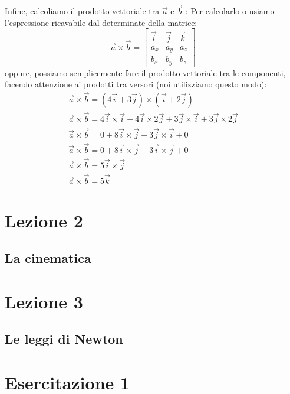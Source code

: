 \documentclass[a4paper]{book}
\begin{document}
Infine, calcoliamo il prodotto vettoriale tra $ \overrightarrow{a} $ e $ \overrightarrow{b} $ :
Per calcolarlo o usiamo l'espressione ricavabile dal determinate della matrice:
$$ \overrightarrow{a} \times \overrightarrow{b} = \begin{bmatrix}
\overrightarrow{i} & \overrightarrow{j} & \overrightarrow{k} \\
a_{x} & a_{y} & a_{z} \\
b_{x} & b_{y} & b_{z}
\end{bmatrix} $$
oppure, possiamo semplicemente fare il prodotto vettoriale tra le componenti, facendo attenzione ai prodotti tra versori (noi utilizziamo questo modo):
\begin{align*}
\overrightarrow{a} \times \overrightarrow{b} = ( 4 \overrightarrow{i} + 3 \overrightarrow{j} ) \times ( \overrightarrow{i} + 2 \overrightarrow{j} ) \\
\overrightarrow{a} \times \overrightarrow{b} = 4 \overrightarrow{i} \times \overrightarrow{i} + 4\overrightarrow{i} \times 2 \overrightarrow{j} + 3 \overrightarrow{j} \times \overrightarrow{i} + 3 \overrightarrow{j} \times 2 \overrightarrow{j} \\
\overrightarrow{a} \times \overrightarrow{b} = 0 + 8 \overrightarrow{i} \times \overrightarrow{j} + 3 \overrightarrow{j} \times \overrightarrow{i} + 0 \\
\overrightarrow{a} \times \overrightarrow{b} = 0 + 8\overrightarrow{i} \times \overrightarrow{j} - 3 \overrightarrow{i} \times \overrightarrow{j} + 0 \\
\overrightarrow{a} \times \overrightarrow{b} = 5 \overrightarrow{i} \times \overrightarrow{j} \\
\overrightarrow{a} \times \overrightarrow{b} = 5 \overrightarrow{k}
\end{align*}




\chapter{Lezione 2}
\section{La cinematica}

\chapter{Lezione 3}
\section{Le leggi di Newton}

\chapter{Esercitazione 1}
\end{document}
